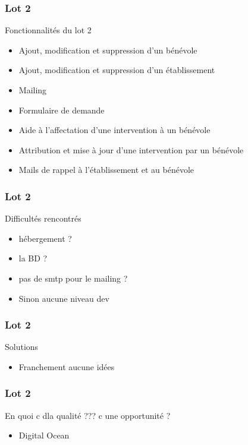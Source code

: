 \speaker{\Florian}

\begin{frame}
\frametitle{Lot 2}
\begin{block}{Fonctionnalités du lot 2}
	\begin{itemize}
		\item Ajout, modification et suppression d'un bénévole
		\item Ajout, modification et suppression d'un établissement
		\item Mailing
		\item Formulaire de demande
		\item Aide à l'affectation d'une intervention à un bénévole
		\item Attribution et mise à jour d'une intervention par un bénévole
		\item Mails de rappel à l'établissement et au bénévole
	\end{itemize}
\end{block}
\end{frame}

\begin{frame}
\frametitle{Lot 2}
\begin{block}{Difficultés rencontrés}
	\begin{itemize}
		\item hébergement ?
		\item la BD ?
		\item pas de smtp pour le mailing ?
		\item Sinon aucune niveau dev
	\end{itemize}
\end{block}
\end{frame}

\begin{frame}
\frametitle{Lot 2}
\begin{block}{Solutions}
	\begin{itemize}
		\item Franchement aucune idées
	\end{itemize}
\end{block}
\end{frame}

\begin{frame}
\frametitle{Lot 2}
\begin{block}{En quoi c dla qualité ??? c une opportunité ?}
	\begin{itemize}
		\item Digital Ocean
	\end{itemize}
\end{block}
\end{frame}